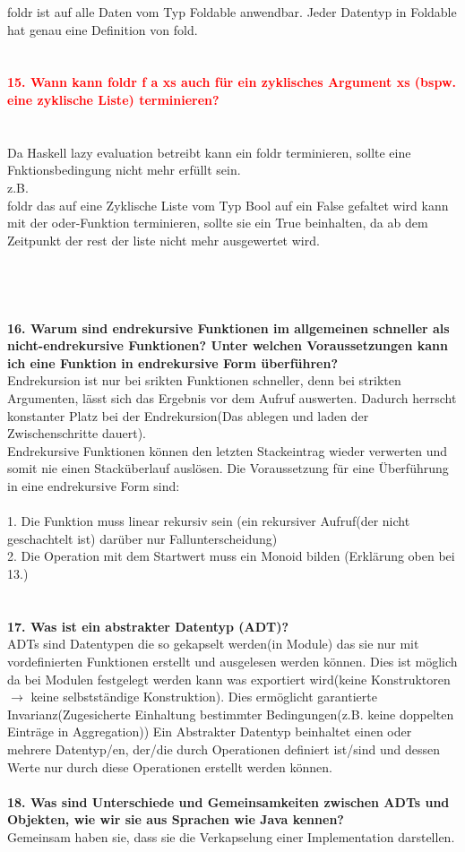 \documentclass{article}
\begin{document}
foldr ist auf alle Daten vom Typ Foldable anwendbar. Jeder Datentyp in Foldable hat genau eine Definition von fold.
\\
\\
\\
\textcolor{red}{\textbf{15. Wann kann foldr f a xs auch für ein zyklisches Argument xs (bspw. eine zyklische Liste) terminieren?}}
\\
\\
\\
Da Haskell lazy evaluation betreibt kann ein foldr terminieren, sollte eine Fnktionsbedingung nicht mehr erf\"ullt sein.\\
z.B.\\
foldr das auf eine Zyklische Liste vom Typ Bool auf ein False gefaltet wird kann mit der oder-Funktion terminieren, sollte sie ein True beinhalten, da ab dem Zeitpunkt der rest der liste nicht mehr ausgewertet wird. 
\\
\\
\\
\\
\\
\textbf{16. Warum sind endrekursive Funktionen im allgemeinen schneller als nicht-endrekursive Funktionen? Unter welchen Voraussetzungen kann ich eine Funktion in endrekursive Form überführen?}
\\
Endrekursion ist nur bei srikten Funktionen schneller, denn bei strikten Argumenten, lässt sich das Ergebnis vor dem Aufruf auswerten. Dadurch herrscht konstanter Platz bei der Endrekursion(Das ablegen und laden der Zwischenschritte dauert).\\
Endrekursive Funktionen können den letzten Stackeintrag wieder verwerten und somit nie einen Stacküberlauf auslösen. Die Voraussetzung für eine Überführung in eine endrekursive Form sind:\\
\\
1. Die Funktion muss linear rekursiv sein (ein rekursiver Aufruf(der nicht geschachtelt ist) dar\"uber nur Fallunterscheidung)\\
2. Die Operation mit dem Startwert muss ein Monoid bilden (Erklärung oben bei 13.)\\
\\
\\
\textbf{17. Was ist ein abstrakter Datentyp (ADT)?}
\\
ADTs sind Datentypen die so gekapselt werden(in Module) das sie nur mit vordefinierten Funktionen erstellt und ausgelesen werden k\"onnen.
Dies ist m\"oglich da bei Modulen festgelegt werden kann was exportiert wird(keine Konstruktoren $\rightarrow$ keine selbstst\"andige Konstruktion). Dies erm\"oglicht garantierte Invarianz(Zugesicherte Einhaltung bestimmter Bedingungen(z.B. keine doppelten Eintr\"age in Aggregation))
Ein Abstrakter Datentyp beinhaltet einen oder mehrere Datentyp/en, der/die durch Operationen definiert ist/sind und dessen Werte nur durch diese Operationen erstellt werden können.
\\
\\
\textbf{18. Was sind Unterschiede und Gemeinsamkeiten zwischen ADTs und Objekten, wie wir sie aus Sprachen wie Java kennen?}
\\
Gemeinsam haben sie, dass sie die Verkapselung einer Implementation darstellen.
\end{document}
